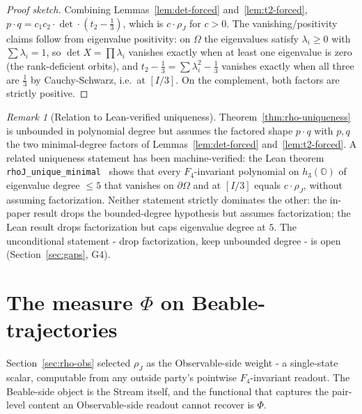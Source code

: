 \documentclass[12pt]{article}
\theoremstyle{remark}
\newtheorem{remark}[theorem]{Remark}
\newcommand{\hthree}{h_3(\mathbb{O})}
\newcommand{\Ffour}{F_4}
\newcommand{\rhoJ}{\rho_J}
\newcommand{\Phiexp}{\Phi}
\begin{document}
\begin{proof}[Proof sketch]
Combining Lemmas~\ref{lem:det-forced} and~\ref{lem:t2-forced},
$p \cdot q = c_1 c_2 \cdot \det \cdot (t_2 - \tfrac{1}{3})$, which is
$c \cdot \rhoJ$ for $c > 0$. The vanishing/positivity claims follow from
eigenvalue positivity: on $\Omega$ the eigenvalues satisfy
$\lambda_i \geq 0$ with $\sum \lambda_i = 1$, so $\det X = \prod \lambda_i$
vanishes exactly when at least one eigenvalue is zero (the rank-deficient
orbits), and $t_2 - \tfrac{1}{3} = \sum \lambda_i^2 - \tfrac{1}{3}$ vanishes
exactly when all three are $\tfrac{1}{3}$ by Cauchy-Schwarz, i.e.\ at
$[I/3]$. On the complement, both factors are strictly positive.
\end{proof}

\begin{remark}[Relation to Lean-verified uniqueness]\label{rem:rho-alternatives}
Theorem~\ref{thm:rho-uniqueness} is unbounded in polynomial degree
but assumes the factored shape $p \cdot q$ with $p, q$ the two
minimal-degree factors of Lemmas~\ref{lem:det-forced}
and~\ref{lem:t2-forced}. A related uniqueness statement has been
machine-verified: the Lean theorem
\texttt{rhoJ\_unique\_minimal}~\cite{lean-rhoj} shows that every
$\Ffour$-invariant polynomial on $\hthree$ of eigenvalue degree
$\leq 5$ that vanishes on $\partial\Omega$ and at $[I/3]$ equals
$c \cdot \rhoJ$, without assuming factorization. Neither statement
strictly dominates the other: the in-paper result drops the
bounded-degree hypothesis but assumes factorization; the Lean result
drops factorization but caps eigenvalue degree at $5$. The
unconditional statement - drop factorization, keep unbounded degree -
is open (Section~\ref{sec:gaps}, G4).
\end{remark}


\section{The measure \texorpdfstring{$\Phiexp$}{Phi} on Beable-trajectories}
\label{sec:phi-def}

Section~\ref{sec:rho-obs} selected $\rhoJ$ as the Observable-side
weight - a single-state scalar, computable from any outside
party's pointwise $\Ffour$-invariant readout. The Beable-side
object is the Stream itself, and the functional that captures the
pair-level content an Observable-side readout cannot recover is
$\Phiexp$.
\end{document}
